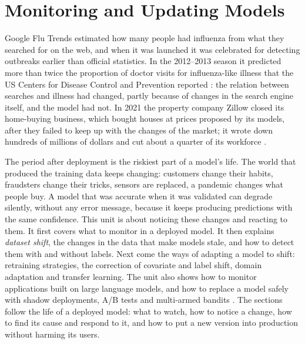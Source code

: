 \chapter{Monitoring and Updating Models}\label{ch:monitoring}

Google Flu Trends estimated how many people had influenza from what they searched for on the web, and when it was
launched it was celebrated for detecting outbreaks earlier than official statistics. In the 2012--2013 season it
predicted more than twice the proportion of doctor visits for influenza-like illness that the US Centers for Disease
Control and Prevention reported \citep{lazer2014parable}: the relation between searches and illness had changed,
partly because of changes in the search engine itself, and the model had not. In 2021 the property company Zillow
closed its home-buying business, which bought houses at prices proposed by its models, after they failed to keep up
with the changes of the market; it wrote down hundreds of millions of dollars and cut about a quarter of its workforce
\citep{zillow2021q3}.

The period after deployment is the riskiest part of a model's life. The world
that produced the training data keeps changing: customers change their habits, fraudsters change
their tricks, sensors are replaced, a pandemic changes what people buy. A model that was accurate
when it was validated can degrade silently, without any error message, because it keeps producing
predictions with the same confidence. This unit is about noticing these changes and reacting to them. It first covers what to
monitor in a deployed model. It then explains \emph{dataset shift}, the changes in the data
that make models stale, and how to detect them with and without labels. Next come the ways of adapting a model to
shift: retraining strategies, the correction of covariate and label shift, domain adaptation
and transfer learning. The unit also shows how to monitor applications built on large language models, and how to replace a model safely with shadow deployments, A/B tests and
multi-armed bandits \citep{ameisen2020building,huyen2022designing}. The sections follow the life of a deployed model: what to watch, how to notice a change, how to find its cause and respond to it, and how to put a new version into production without harming its users.

